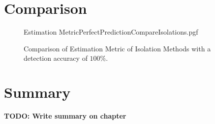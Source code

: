 %	

\section{Comparison}
\begin{figure}[!htb]
	\centering
	{Estimation MetricPerfectPredictionCompareIsolations.pgf}
	
	\caption{Comparison of Estimation Metric of Isolation Methods with a detection accuracy of $100\%$.}
	\label{fig:IsolationMethodsWithPerfectPrediction}
\end{figure}

\section{Summary}
\textbf{TODO: Write summary on chapter}